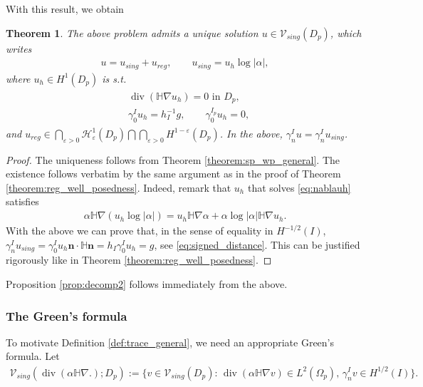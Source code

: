 \documentclass[report]{elsarticle}
\newtheorem{theorem}{Theorem}[section]
\numberwithin{theorem}{section}
\renewcommand{\vec}[1]{\mathbf{#1}}
\newcommand{\re}{\varepsilon}
\begin{document}
With this result, we obtain 
\begin{theorem}
	\label{theorem:decomposition_general}
	The above problem admits a unique solution $u\in \mathcal{V}_{sing}(D_p)$, which writes
	\begin{align*}
		u=u_{sing}+u_{reg}, \qquad u_{sing}=u_h\log|\alpha|,
	\end{align*}
	where $u_h\in H^1(D_p)$ is s.t. 
	\begin{align}
		\label{eq:nablauh}
		\begin{split}
			&\operatorname{div}(\mathbb{H}\nabla u_h)=0 \text{ in }D_p,\\
			&\gamma_0^{I}u_h=h_{I}^{-1}g,\qquad 	\gamma_0^{I_p}u_h=0, 
		\end{split}
	\end{align}
	and $u_{reg}\in \bigcap_{\re>0}\mathcal{H}^{1}_{\re}(D_p)\bigcap \bigcap_{\re>0}H^{1-\re}(D_p)$. In the above, $\gamma_n^I u=\gamma_n^Iu_{sing}$.  
\end{theorem}
\begin{proof}
	The uniqueness follows from Theorem \ref{theorem:sp_wp_general}. The existence follows verbatim by the same argument as in the proof of Theorem \ref{theorem:reg_well_posedness}. Indeed, remark that $u_h$ that solves \eqref{eq:nablauh} satisfies
	\begin{align*}
		\alpha \mathbb{H}\nabla (u_h\log|\alpha|)= u_h\mathbb{H}\nabla \alpha+\alpha\log|\alpha|\mathbb{H}\nabla u_h.
	\end{align*}
With the above we can prove that, in the sense of equality in $H^{-1/2}(I)$,  $\gamma_n^Iu_{sing}=\gamma_0^{I}u_h\vec{n}\cdot \mathbb{H}\vec{n}=h_I\gamma_0^Iu_h=g$, see \eqref{eq:signed_distance}. This can be justified  rigorously like in Theorem \ref{theorem:reg_well_posedness}. 
\end{proof}
Proposition \ref{prop:decomp2} follows immediately from the above. 


\subsubsection{The Green's formula}
\label{sec:green_general}
To motivate Definition \ref{def:trace_general}, we need an appropriate Green's formula. 
Let 
\begin{align*}
	\mathcal{V}_{sing}(\operatorname{div}(\alpha \mathbb{H}\nabla .); D_p):=\{v\in \mathcal{V}_{sing}(D_p): \, \operatorname{div}(\alpha\mathbb{H}\nabla v)\in L^2(\Omega_p), \, \gamma_n^{I}v\in H^{1/2}(I)\}.
\end{align*}
\end{document}
